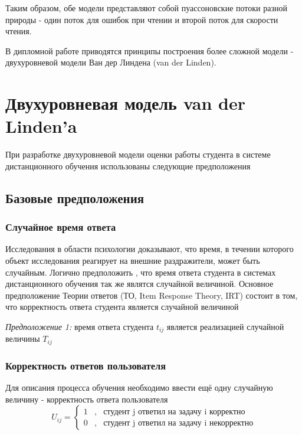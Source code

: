 Таким образом, обе модели представляют собой пуассоновские потоки разной природы - один поток для ошибок при чтении и второй поток для скорости чтения.

В дипломной работе приводятся принципы построения более сложной модели - двухуровневой модели Ван дер Линдена (van der Linden).

\section{Двухуровневая модель van der Linden'a}

При разработке двухуровневой модели оценки работы студента в системе \\дистанционного обучения использованы следующие предположения

\subsection{Базовые предположения}

\subsubsection{Случайное время ответа}

Исследования в области психологии доказывают, что время, в течении которого объект исследования реагирует на внешние раздражители, может быть случайным. Логично предположить , что время ответа студента в сис\-темах дистанционного обучения так же являтся случайной величиной. Ос\-новное предположение Теории ответов (ТО, Item Response Theory, IRT) со\-стоит в том, что корректность ответа студента является случайной величиной

{\itshape Предположение 1:} время ответа студента $t_{ij}$ является реализацией слу\-чайной величины $T_{ij}$

\subsubsection{Корректность ответов пользователя}

Для описания процесса обучения необходимо ввести ещё одну слу\-чайную величину - корректность ответа пользователя
$$
U_{ij} = 
\left\{
\begin{array}{ccl}
1 &,& \mbox{студент j ответил на задачу i корректно}\\
0 &,& \mbox{студент j ответил на задачу i некорректно}
\end{array}
\right.
$$

